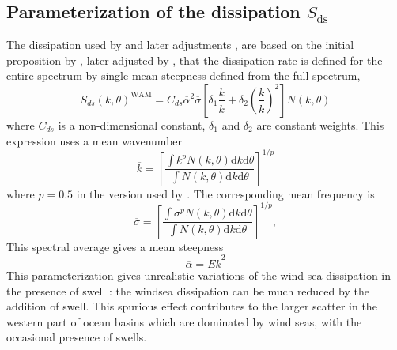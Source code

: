 \subsection{Parameterization of the dissipation $S_{\mathrm{ds}}$}
The dissipation used by \cite{Bidlot&al.2005} and later adjustments \citep{Bidlot2012}, are based on the initial proposition by 
\cite{Hasselmann1974}, later adjusted by \cite{Komen&al.1984}, that the dissipation rate is defined for the 
entire spectrum by single mean steepness defined from the full spectrum, 
\begin{equation}
S_{ds}\left(k,\theta\right)^{\mathrm{WAM}} = C_{ds}
\overline{\alpha}^2
 \overline{\sigma} \left[\delta_1 \frac{k}{\overline{k}} + \delta_2
\left(\frac{k}{\overline{k}}\right)^2\right]\label{eq:SdsWAM4}
N\left(k,\theta\right)
\end{equation}
where $C_{ds}$ is a non-dimensional constant, 
$\delta_1$ and $\delta_2$ are constant weights. This expression uses a mean wavenumber 
\begin{equation}
\overline{k}=\left[\frac{\int k^p N\left(k,\theta\right){\mathrm d}k  {\mathrm
d} \theta}{\int N\left(k,\theta\right) {\mathrm d}k {\mathrm d}
\theta}\right]^{1/p}
\end{equation}
where $p=0.5$ in the version used by \cite{Bidlot&al.2005}. The corresponding mean frequency is 
\begin{equation}
\overline{\sigma}=\left[\frac{\int \sigma^p N\left(k,\theta\right)
{\mathrm d}k  {\mathrm d} \theta}{ \int N\left(k,\theta\right) {\mathrm d}k  {\mathrm d}
\theta}\right]^{1/p},
\end{equation}
This spectral average gives a mean steepness 
\begin{equation}
\overline{\alpha}=E
\overline{k}^2 
\end{equation}
This parameterization gives unrealistic variations of the wind sea dissipation in the 
presence of swell \citep{Ardhuin&al.2007}: the windsea dissipation can be much reduced by the addition of swell. 
This spurious effect contributes to the 
larger scatter in the western part of ocean basins which are dominated by wind seas, with the occasional 
presence of swells. 

